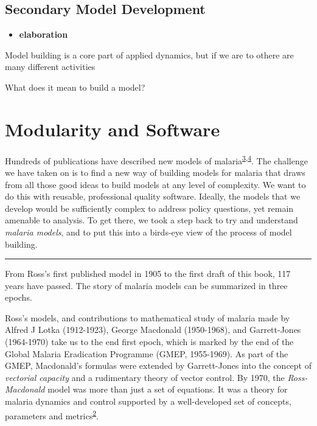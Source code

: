 \documentclass[
]{book}
\providecommand{\tightlist}{%
  \setlength{\itemsep}{0pt}\setlength{\parskip}{0pt}}
\begin{document}
\hypertarget{secondary-model-development}{%
\section{Secondary Model Development}\label{secondary-model-development}}

\begin{itemize}
\tightlist
\item
  \textbf{elaboration}
\end{itemize}

Model building is a core part of applied dynamics, but if we are to othere are many different activities

What does it mean to build a model?

\hypertarget{modularity-and-software}{%
\chapter{Modularity and Software}\label{modularity-and-software}}

Hundreds of publications have described new models of malaria\textsuperscript{\protect\hyperlink{ref-ReinerRC2013SystematicReview}{3},\protect\hyperlink{ref-SmithNR2018AgentbasedModels}{4}}. The challenge we have taken on is to find a new way of building models for malaria that draws from all those good ideas to build models at any level of complexity. We want to do this with reusable, professional quality software. Ideally, the models that we develop would be sufficiently complex to address policy questions, yet remain amenable to analysis. To get there, we took a step back to try and understand \emph{malaria models}, and to put this into a birds-eye view of the process of model building.

\begin{center}\rule{0.5\linewidth}{0.5pt}\end{center}

From Ross's first published model in 1905 to the first draft of this book, 117 years have passed. The story of malaria models can be summarized in three epochs.

Ross's models, and contributions to mathematical study of malaria made by Alfred J Lotka (1912-1923), George Macdonald (1950-1968), and Garrett-Jones (1964-1970) take us to the end first epoch, which is marked by the end of the Global Malaria Eradication Programme (GMEP, 1955-1969). As part of the GMEP, Macdonald's formulas were extended by Garrett-Jones into the concept of \emph{vectorial capacity} and a rudimentary theory of vector control. By 1970, the \emph{Ross-Macdonald} model was more than just a set of equations. It was a theory for malaria dynamics and control supported by a well-developed set of concepts, parameters and metrics\textsuperscript{\protect\hyperlink{ref-SmithDL2012_RossMacdonald}{2}}.
\end{document}
